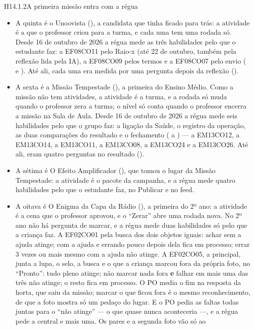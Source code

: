 \begin{historia}{H14.1.2}{A primeira missão entra com a régua}{\pronto}
\begin{itemize}
    guardadas.
  \item A quinta é o Unoovista (), a candidata que tinha ficado
    para trás: a atividade é a que o professor criou para a turma, e cada uma
    tem uma rodada só. Desde 16 de outubro de 2026 a régua mede as três
    habilidades pelo que o estudante faz: a EF08CO11 pelo Raio-x (até 22 de
    outubro, também pela reflexão lida pela IA), a EF08CO09 pelos termos e a
    EF08CO07 pelo envio ( e ). Até ali, cada uma era medida por uma
    pergunta depois da reflexão ().
  \item A sexta é a Missão Tempestade (), a primeira do Ensino
    Médio. Como a missão não tem atividades, a atividade é a turma, e a rodada
    só muda quando o professor zera a turma; o nível só conta quando o
    professor encerra a missão na Sala de Aula. Desde 16 de outubro de 2026 a
    régua mede seis habilidades pelo que o grupo faz: a ligação da Saúde, o
    registro da operação, as duas comparações do resultado e o fechamento
    ( a ) --- a EM13CO12, a EM13CO14, a EM13CO11, a
    EM13CO08, a EM13CO24 e a EM13CO26. Até ali, eram quatro perguntas no
    resultado ().
  \item A sétima é O Efeito Amplificador (), que tomou o lugar da
    Missão Tempestade: a atividade é o pacote da campanha, e a régua mede
    quatro habilidades pelo que o estudante faz, no Publicar e no feed.
  \item A oitava é O Enigma da Capa da Rádio (), a primeira do
    2º ano: a atividade é a cena que o professor aprovou, e o \enquote{Zerar}
    abre uma rodada nova. No 2º ano não há pergunta de marcar, e a régua mede
    duas habilidades só pelo que a criança faz. A EF02CO01 pela busca dos dois
    objetos iguais: achar sem a ajuda atinge; com a ajuda e errando pouco
    depois dela fica em processo; errar 3 vezes ou mais mesmo com a ajuda não
    atinge. A EF02CO05, a principal, junta a lupa, o selo, a busca e o que a
    criança marcou fora da própria foto, no \enquote{Pronto}: tudo pleno
    atinge; não marcar nada fora \textbf{e} falhar em mais uma das três não
    atinge; o resto fica em processo. O PO media o fim na resposta da horta,
    que saiu da missão; marcar o que ficou fora é o mesmo reconhecimento, de
    que a foto mostra só um pedaço do lugar. E o PO pedia as faltas todas
    juntas para o \enquote{não atinge} --- o que quase nunca aconteceria ---,
    e a régua pede a central e mais uma. Os pares e a segunda foto vão só ao

\end{itemize}
\end{historia}
